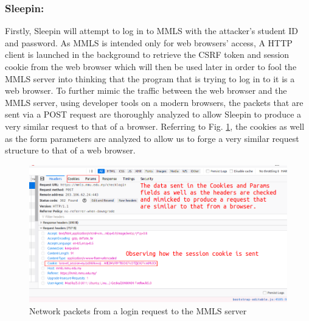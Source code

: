 \documentclass[runningheads]{llncs}
\begin{document}
\subsubsection{Sleepin:}
Firstly, Sleepin will attempt to log in to MMLS with the attacker's student ID and password. As MMLS is intended only for web browsers' access, A HTTP client is launched in the background to retrieve the CSRF token and session cookie from the web browser which will then be used later in order to fool the MMLS server into thinking that the program that is trying to log in to it is a web browser. To further mimic the traffic between the web browser and the MMLS server, using developer tools on a modern browsers, the packets that are sent via a POST request are thoroughly analyzed to allow Sleepin to produce a very similar request to that of a browser. Referring to Fig. \ref{fig:header_analysis}, the cookies as well as the form parameters are analyzed to allow us to forge a very similar request structure to that of a web browser.  

\begin{figure}
    \includegraphics[width=\textwidth]{imgres/header_analysis.png}
\caption{Network packets from a login request to the MMLS server} 
\label{fig:header_analysis}
\centering
\end{figure}
\end{document}
